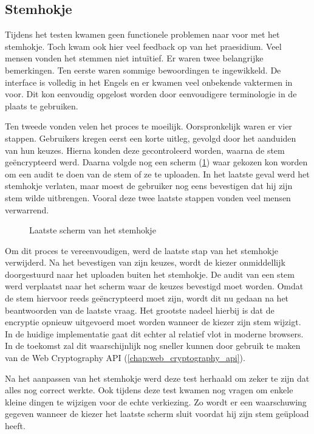 \subsection{Stemhokje}
\label{sec:kv:stemhokje}

Tijdens het testen kwamen geen functionele problemen naar voor met het stemhokje. Toch kwam ook hier veel feedback op van het praesidium. Veel mensen vonden het stemmen niet intu\"itief. Er waren twee belangrijke bemerkingen. Ten eerste waren sommige bewoordingen te ingewikkeld. De interface is volledig in het Engels en er kwamen veel onbekende vaktermen in voor. Dit kon eenvoudig opgelost worden door eenvoudigere terminologie in de plaats te gebruiken.

\npar Ten tweede vonden velen het proces te moeilijk. Oorspronkelijk waren er vier stappen. Gebruikers kregen eerst een korte uitleg, gevolgd door het aanduiden van hun keuzes. Hierna konden deze gecontroleerd worden, waarna de stem ge\"encrypteerd werd. Daarna volgde nog een scherm (\ref{fig:kv:booth_submit}) waar gekozen kon worden om een audit te doen van de stem of ze te uploaden. In het laatste geval werd het stemhokje verlaten, maar moest de gebruiker nog eens bevestigen dat hij zijn stem wilde uitbrengen. Vooral deze twee laatste stappen vonden veel mensen verwarrend.

\begin{figure}
  \caption{Laatste scherm van het stemhokje}
  \label{fig:kv:booth_submit}
\end{figure}

\npar Om dit proces te vereenvoudigen, werd de laatste stap van het stemhokje verwijderd. Na het bevestigen van zijn keuzes, wordt de kiezer onmiddellijk doorgestuurd naar het uploaden buiten het stemhokje. De audit van een stem werd verplaatst naar het scherm waar de keuzes bevestigd moet worden. Omdat de stem hiervoor reeds ge\"encrypteerd moet zijn, wordt dit nu gedaan na het beantwoorden van de laatste vraag. Het grootste nadeel hierbij is dat de encryptie opnieuw uitgevoerd moet worden wanneer de kiezer zijn stem wijzigt. In de huidige implementatie gaat dit echter al relatief vlot in moderne browsers. In de toekomst zal dit waarschijnlijk nog sneller kunnen door gebruik te maken van de Web Cryptography API (\ref{chap:web_cryptography_api}).

\npar Na het aanpassen van het stemhokje werd deze test herhaald om zeker te zijn dat alles nog correct werkte. Ook tijdens deze test kwamen nog vragen om enkele kleine dingen te wijzigen voor de echte verkiezing. Zo wordt er een waarschuwing gegeven wanneer de kiezer het laatste scherm sluit voordat hij zijn stem ge\"upload heeft.

